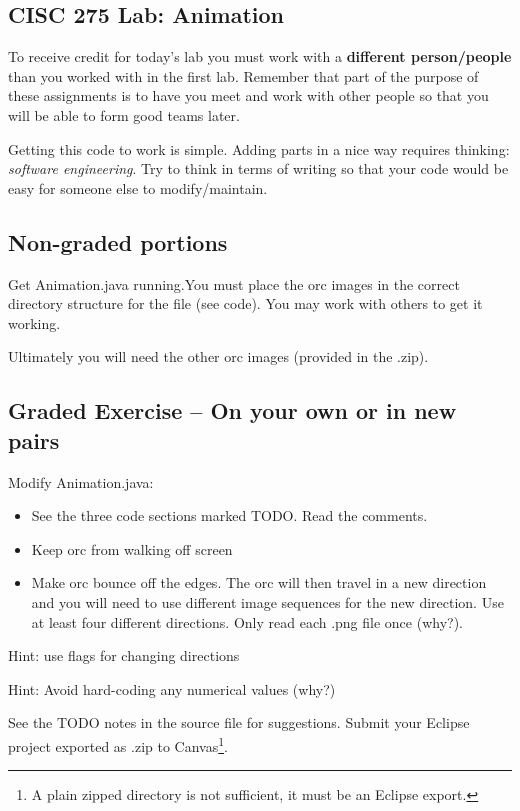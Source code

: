 \documentclass{article}
\begin{document}
\subsection*{
CISC 275 Lab: Animation }

To receive credit for today's lab you must work with a {\bf different person/people}
than you worked with in the first lab. Remember that part of the purpose of these assignments is to have you meet and work with other people so that you will be able to form good teams later.

Getting this code to work is simple. Adding parts in a nice way requires thinking: \emph{software engineering}. Try to think in terms of writing so that your code would be easy for someone else to modify/maintain.

\subsection*{Non-graded portions}
\label{sec:non-graded-portions}

Get Animation.java running.You must place the orc images in the correct directory structure for the file (see code). You may work with others to get it working.

Ultimately you will need the other orc images (provided in the .zip). 

\subsection*{Graded Exercise – On your own or in new pairs
}
\label{sec:graded-exercise-}

Modify Animation.java:

\begin{itemize}

\item See the three code sections marked TODO. Read the comments.

\item Keep orc from walking off screen

\item Make orc bounce off the edges. The orc will then travel in a new
  direction and you will need to use different image sequences for the
  new direction. Use at least four different directions. Only read
  each .png file once (why?).
\end{itemize}

Hint: use flags for changing directions

Hint: Avoid hard-coding any numerical values (why?)

See the TODO notes in the source file for suggestions. Submit your Eclipse project exported as .zip to Canvas\footnote{A plain zipped directory is not sufficient, it must be an Eclipse export.}.
\end{document}
